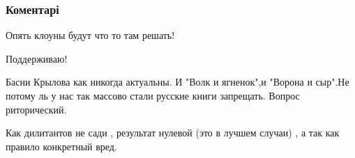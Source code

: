  
 
 
 
 
\subsubsection{Коментарі}

\begin{itemize}
 
Опять клоуны будут что то там решать!

 
Поддерживаю!

 

Басни Крылова как никогда актуальны. И "Волк и ягненок",и "Ворона и сыр".Не
потому ль у нас так массово стали русские книги запрещать. Вопрос риторический.


 
Как дилитантов не сади , результат нулевой (это в лучшем случаи) , а так как правило конкретный вред.

 


\end{itemize}
